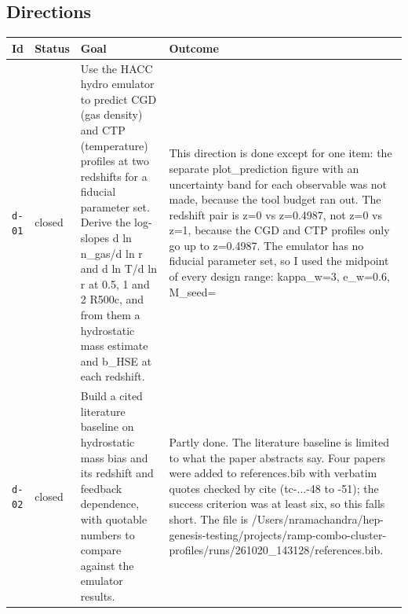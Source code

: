 \documentclass[11pt,a4paper]{article}
\begin{document}
\subsection{Directions}
\begin{longtable}{@{}p{}p{}p{}p{}@{}}
\toprule Id & Status & Goal & Outcome \\ \midrule \endhead
\texttt{d-01} & closed & Use the HACC hydro emulator to predict CGD (gas density) and CTP (temperature) profiles at two redshifts for a fiducial parameter set. Derive the log-slopes d ln n\_gas/d ln r and d ln T/d ln r at 0.5, 1 and 2 R500c, and from them a hydrostatic mass estimate and b\_HSE at each redshift. & This direction is done except for one item: the separate plot\_prediction figure with an uncertainty band for each observable was not made, because the tool budget ran out. The redshift pair is z=0 vs z=0.4987, not z=0 vs z=1, because the CGD and CTP profiles only go up to z=0.4987. The emulator has no fiducial parameter set, so I used the midpoint of every design range: kappa\_w=3, e\_w=0.6, M\_seed= \\
\texttt{d-02} & closed & Build a cited literature baseline on hydrostatic mass bias and its redshift and feedback dependence, with quotable numbers to compare against the emulator results. & Partly done. The literature baseline is limited to what the paper abstracts say. Four papers were added to references.bib with verbatim quotes checked by cite (tc-...-48 to -51); the success criterion was at least six, so this falls short. The file is /Users/nramachandra/hep-genesis-testing/projects/ramp-combo-cluster-profiles/runs/261020\_143128/references.bib.


\end{longtable}
\end{document}
